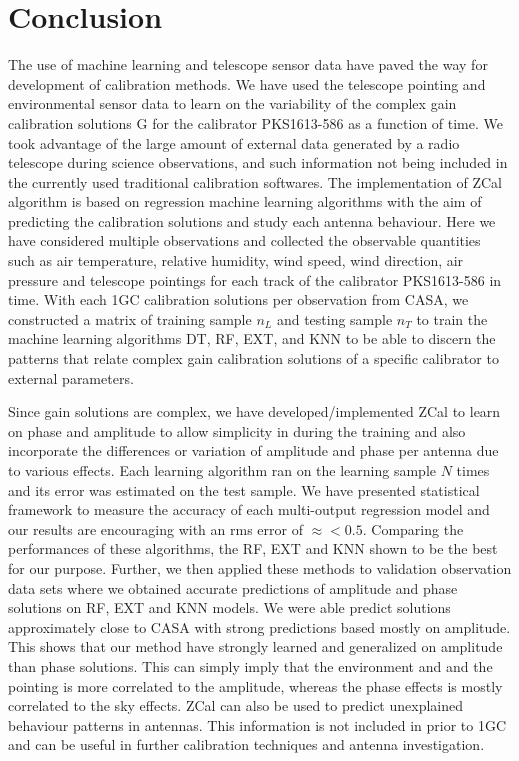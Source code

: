 \chapter{Conclusion}

The use of machine learning and telescope sensor data have paved the way for development of calibration methods. We have used the telescope pointing and environmental sensor data to learn on the variability of the complex gain calibration solutions G for the calibrator PKS1613-586 as a function of time. We took advantage of the large amount of external data generated by a radio telescope during science observations, and such information not being included in the currently used traditional calibration softwares. The implementation of  ZCal algorithm is based on regression machine learning algorithms with the aim of predicting the calibration solutions and study each antenna behaviour. Here we have considered multiple observations and collected the observable quantities such as air temperature, relative humidity, wind speed, wind direction, air pressure and telescope pointings for each track of the calibrator PKS1613-586 in time. With each 1GC calibration solutions per observation from CASA, we constructed a matrix of training sample $n_L$ and testing sample $n_T$ to train the machine learning algorithms DT, RF, EXT, and KNN to be able to discern the patterns that relate complex gain  calibration solutions of a specific calibrator to external parameters.       

Since gain solutions are complex, we have developed/implemented  ZCal to learn on phase and amplitude to allow simplicity in during the training and also incorporate the differences or variation of amplitude and phase per antenna due to various effects. Each learning algorithm ran on the learning sample $N$ times and its error was estimated on the test sample. We have presented statistical framework to measure the accuracy of each multi-output regression model and our results are encouraging with an rms error of $\approx < 0.5$. Comparing the performances of these algorithms, the RF, EXT and KNN shown to be the best for our purpose. Further, we then applied these methods to validation observation data sets where we obtained accurate predictions of amplitude and phase solutions on RF, EXT and KNN models. We were able predict solutions approximately close to CASA with strong predictions based mostly on amplitude. This shows that our method have strongly learned and generalized on amplitude than phase solutions. This can simply imply that the environment and and the pointing is more correlated to the amplitude, whereas the phase effects is mostly correlated to the sky effects. ZCal can also be used to predict unexplained behaviour patterns in antennas. This information is not included in prior to 1GC and can be useful in further calibration techniques and antenna investigation.

